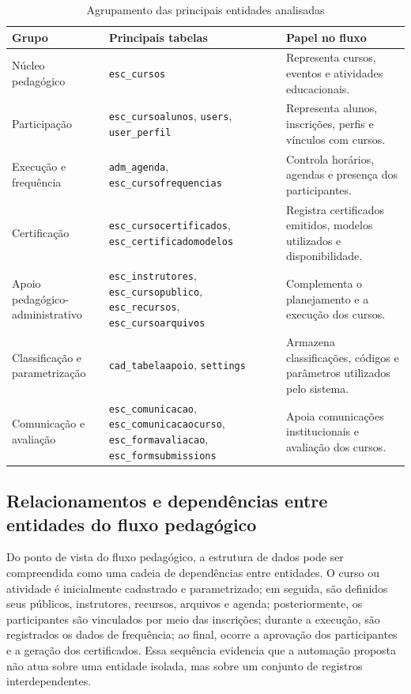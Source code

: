\begin{table}[H]
\centering
\caption{Agrupamento das principais entidades analisadas}
\label{tab:agrupamento-entidades-fluxo}
\begin{tabular}{p{4cm} p{5cm} p{5cm}}
\hline
\textbf{Grupo} & \textbf{Principais tabelas} & \textbf{Papel no fluxo} \\
\hline
Núcleo pedagógico & \texttt{esc\_cursos} & Representa cursos, eventos e atividades educacionais. \\
\hline
Participação & \texttt{esc\_cursoalunos}, \texttt{users}, \texttt{user\_perfil} & Representa
alunos, inscrições, perfis e vínculos com cursos. \\
\hline
Execução e frequência & \texttt{adm\_agenda}, \texttt{esc\_cursofrequencias} & Controla horários,
agendas e presença dos participantes. \\
\hline
Certificação & \texttt{esc\_cursocertificados}, \texttt{esc\_certificadomodelos} & Registra
certificados emitidos, modelos utilizados e disponibilidade. \\
\hline
Apoio pedagógico-administrativo & \texttt{esc\_instrutores}, \texttt{esc\_cursopublico},
\texttt{esc\_recursos}, \texttt{esc\_cursoarquivos} & Complementa o planejamento e a execução dos cursos. \\
\hline
Classificação e parametrização & \texttt{cad\_tabelaapoio}, \texttt{settings} & Armazena
classificações, códigos e parâmetros utilizados pelo sistema. \\
\hline
Comunicação e avaliação & \texttt{esc\_comunicacao}, \texttt{esc\_comunicacaocurso}, \texttt{esc\_formavaliacao},
\texttt{esc\_formsubmissions} & Apoia comunicações institucionais e avaliação dos cursos. \\
\hline
\end{tabular}
\end{table}

\subsection{Relacionamentos e dependências entre entidades do fluxo pedagógico}
\label{sec:metod:analise_sis:relacionamentos}


Do ponto de vista do fluxo pedagógico, a estrutura de dados pode ser
compreendida como uma cadeia de dependências entre entidades. O curso ou
atividade é inicialmente cadastrado e parametrizado; em seguida, são
definidos seus públicos, instrutores, recursos, arquivos e agenda;
posteriormente, os participantes são vinculados por meio das
inscrições; durante a execução, são registrados os dados de frequência;
ao final, ocorre a aprovação dos participantes e a geração dos
certificados. Essa sequência evidencia que a automação proposta não
atua sobre uma entidade isolada, mas sobre um conjunto de registros
interdependentes.

